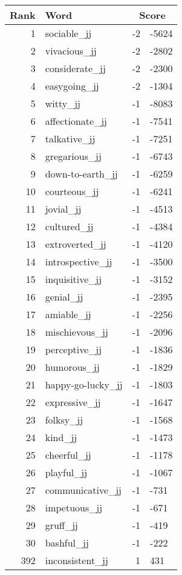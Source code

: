 \begin{longtable}[!htbp]{| rlr@{.}l |}
    \hline
    \textbf{Rank} & \textbf{Word} & \multicolumn{2}{c|}{\textbf{Score}} \\
    \hline
    \endhead
    1 & sociable\_jj & -2 & -5624 \\
    2 & vivacious\_jj & -2 & -2802 \\
    3 & considerate\_jj & -2 & -2300 \\
    4 & easygoing\_jj & -2 & -1304 \\
    5 & witty\_jj & -1 & -8083 \\
    6 & affectionate\_jj & -1 & -7541 \\
    7 & talkative\_jj & -1 & -7251 \\
    8 & gregarious\_jj & -1 & -6743 \\
    9 & down-to-earth\_jj & -1 & -6259 \\
    10 & courteous\_jj & -1 & -6241 \\
    11 & jovial\_jj & -1 & -4513 \\
    12 & cultured\_jj & -1 & -4384 \\
    13 & extroverted\_jj & -1 & -4120 \\
    14 & introspective\_jj & -1 & -3500 \\
    15 & inquisitive\_jj & -1 & -3152 \\
    16 & genial\_jj & -1 & -2395 \\
    17 & amiable\_jj & -1 & -2256 \\
    18 & mischievous\_jj & -1 & -2096 \\
    19 & perceptive\_jj & -1 & -1836 \\
    20 & humorous\_jj & -1 & -1829 \\
    21 & happy-go-lucky\_jj & -1 & -1803 \\
    22 & expressive\_jj & -1 & -1647 \\
    23 & folksy\_jj & -1 & -1568 \\
    24 & kind\_jj & -1 & -1473 \\
    25 & cheerful\_jj & -1 & -1178 \\
    26 & playful\_jj & -1 & -1067 \\
    27 & communicative\_jj & -1 & -731 \\
    28 & impetuous\_jj & -1 & -671 \\
    29 & gruff\_jj & -1 & -419 \\
    30 & bashful\_jj & -1 & -222 \\
    392 & inconsistent\_jj & 1 & 431 \\

\end{longtable}
